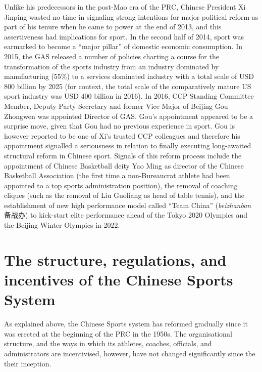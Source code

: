 \begin{CJK}{UTF8}{gbsn}
Unlike his predecessors in the post-Mao era of the PRC, Chinese President Xi Jinping wasted no time in signaling strong intentions for major political reform as part of his tenure when he came to power at the end of 2013, and this assertiveness had implications for sport.  In the second half of 2014, sport was earmarked to become a ``major pillar'' of domestic economic consumption. In 2015, the GAS released a number of policies charting a course for the transformation of the sports industry from an industry dominated by manufacturing (55\%) to a services dominated industry with a total scale of USD 800 billion by 2025 (for context, the total scale of the comparatively mature US sport industry was USD 400 billion in 2016).  In 2016, CCP Standing Committee Member, Deputy Party Secretary and former Vice Major of Beijing Gou Zhongwen was appointed Director of GAS.  Gou's appointment appeared to be a surprise move, given that Gou had no previous experience in sport. Gou is however reported to be one of Xi's trusted CCP colleagues and therefore his appointment signalled a seriousness in relation to finally executing long-awaited structural reform in Chinese sport.  Signals of this reform process include the appointment of Chinese Basketball deity Yao Ming as director of the Chinese Basketball Association (the first time a non-Bureaucrat athlete had been appointed to a top sports administration position), the removal of coaching cliques (such as the removal of Liu Guoliang as head of table tennis), and the establishment of new high performance model called ``Team China'' (\textit{beizhanban} 备战办) to kick-start elite performance ahead of the Tokyo 2020 Olympics and the Beijing Winter Olympics in 2022.





\section{The structure, regulations, and incentives of the Chinese Sports System}

As explained above, the Chinese Sports system has reformed gradually since it was erected at the beginning of the PRC in the 1950s. The organisational structure, and the ways in which its athletes, coaches, officials, and administrators are incentivised, however, have not changed significantly since the their inception.


\end{CJK}
